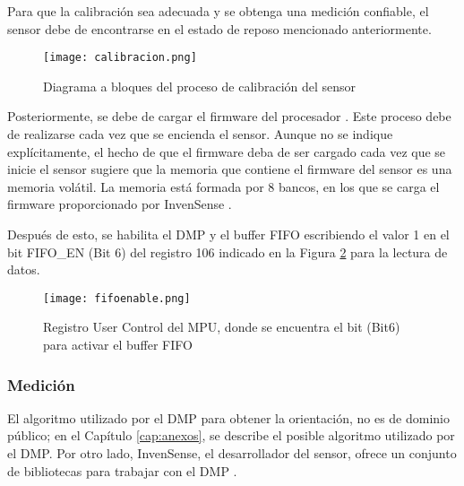 Para que la calibración sea adecuada y se obtenga una medición confiable, el sensor debe de encontrarse en el estado de reposo mencionado anteriormente.

\begin{figure}[htb]
	\centering
	\texttt{[image: calibracion.png]}
	\caption{Diagrama a bloques del proceso de calibración del sensor}
	\label{fig:calibracion}
\end{figure}

\newpage
Posteriormente, se debe de cargar el firmware del procesador \cite{userguideMotionDriver}. Este proceso debe de realizarse cada vez que se encienda el sensor. Aunque no se indique explícitamente, el hecho de que el firmware deba de ser cargado cada vez que se inicie el sensor sugiere que la memoria que contiene el firmware del sensor es una memoria volátil. La memoria está formada por 8 bancos, en los que se carga el firmware proporcionado por InvenSense \cite{userguideMotionDriver}. 

Después de esto, se habilita el DMP y el buffer FIFO escribiendo el valor 1 en el bit FIFO\_EN (Bit 6) del registro 106 indicado en la Figura \ref{fig:fifoen} para la lectura de datos.

\begin{figure}[htb]
	\centering
	\texttt{[image: fifoenable.png]}
	\caption{Registro User Control del MPU, donde se encuentra el bit (Bit6) para activar el buffer FIFO}
	\label{fig:fifoen}
\end{figure}

\subsubsection{Medición}

El algoritmo utilizado por el DMP para obtener la orientación, no es de dominio público; en el Capítulo \ref{cap:anexos}, se describe el posible algoritmo utilizado por el DMP. Por otro lado, InvenSense, el desarrollador del sensor, ofrece un conjunto de bibliotecas para trabajar con el DMP \cite{userguideMotionDriver}.


